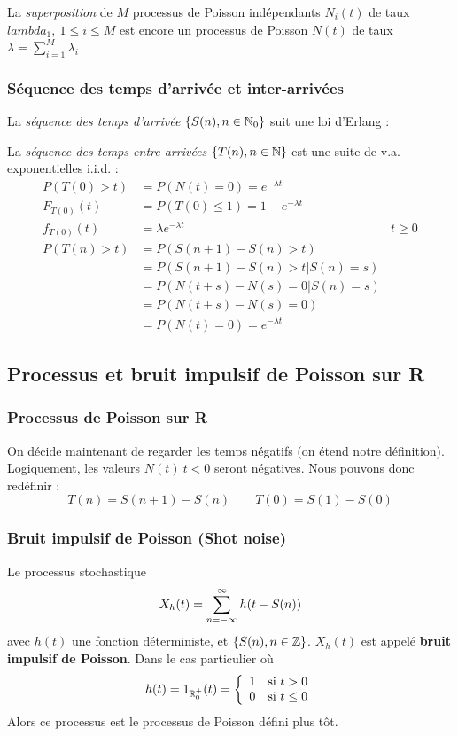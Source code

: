 \documentclass[11pt,a4paper]{article}
\numberwithin{equation}{section}
\begin{document}
La \textit{superposition} de $M$ processus de Poisson indépendants $N_i(t)$ de taux $lambda_1,\ 1\leq i\leq M$ est encore un processus de Poisson $N(t)$ de taux $\lambda = \sum_{i=1}^M \lambda_i$

\subsubsection{Séquence des temps d'arrivée et inter-arrivées}
La \textit{séquence des temps d'arrivée} $\{S(n), n\in \mathbb{N}_0\}$ suit une loi d'Erlang :

La \textit{séquence des temps entre arrivées} $\{T(n), n \in \mathbb{N}\}$ est une suite de v.a. exponentielles i.i.d. :
\[\begin{array}{lll}
    P(T(0) > t) &= P(N(t) = 0) = e^{-\lambda t}\\
    F_{T(0)}(t) &= P(T(0) \leq 1) = 1- e^{-\lambda t}\\
    f_{T(0)}(t) &= \lambda e^{-\lambda t} & t\geq 0\\
    P(T(n) > t) &= P(S(n+1) - S(n) > t)\\
                &= P(S(n+1) - S(n) > t | S(n) = s)\\
                &= P(N(t+s) - N(s) = 0 | S(n) = s)\\
                &= P(N(t+s) - N(s) = 0)\\
                &= P(N(t) = 0) = e^{-\lambda t}
\end{array}\]

\subsection{Processus et bruit impulsif de Poisson sur R}
\subsubsection{Processus de Poisson sur R}
On décide maintenant de regarder les temps négatifs (on étend notre définition). Logiquement, les valeurs $N(t)\ t < 0$ seront négatives. Nous pouvons donc redéfinir :
\begin{equation}
    T(n) = S(n+1) - S(n)\qquad T(0) = S(1) - S(0)
\end{equation}

\subsubsection{Bruit impulsif de Poisson (Shot noise)}
Le processus stochastique
\begin{equation}
    X_h(t) = \sum\limits_{n=-\infty}^{\infty} h(t- S(n))
\end{equation}
avec $h(t)$ une fonction déterministe, et $\{S(n), n \in \mathbb{Z}\}$. $X_h(t)$ est appelé \textbf{bruit impulsif de Poisson}. Dans le cas particulier où 
\[h(t) = 1_{\mathbb{R}_0^+}(t) = \left\{\begin{array}{ll}
    1 & \text{si } t > 0\\
    0 & \text{si } t \leq 0
\end{array}\right.\]
Alors ce processus est le processus de Poisson défini plus tôt. 
\end{document}
